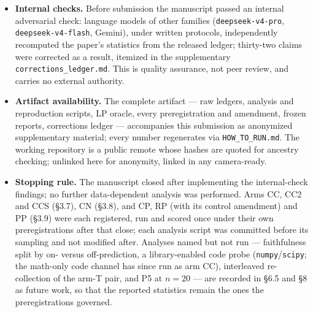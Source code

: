 \begin{itemize}
  specified the instruments and their decision rules, approved each preregistration before
  sampling, made the final inclusion, stopping and submission decisions, and is solely
  responsible for the content. The claim a reader can check is the ordering, not the
  authorship: each preregistration commit is a git ancestor of the sampling it governs.
  Because the drafting models share a family with arms under study (\S5), what a reader is
  asked to trust is the released artifact --- the scripts, raw ledgers, LP oracle and frozen
  outputs, all of which accompany this submission as anonymized supplementary material --- not the author.
\item \textbf{Internal checks.} Before submission the manuscript passed an internal adversarial
  check: language models of other families (\texttt{deepseek-v4-pro}, \texttt{deepseek-v4-flash},
  Gemini), under written protocols, independently recomputed the paper's statistics from the
  released ledger; thirty-two claims were corrected as a result, itemized in the supplementary
  \texttt{corrections\_ledger.md}. This is quality assurance, not peer review, and carries no
  external authority.
\item \textbf{Artifact availability.} The complete artifact --- raw ledgers, analysis and
  reproduction scripts, LP oracle, every preregistration and amendment, frozen reports,
  corrections ledger --- accompanies this submission as anonymized supplementary material;
  every number regenerates via \texttt{HOW\_TO\_RUN.md}. The working repository is a public
  remote whose hashes are quoted for ancestry checking; unlinked here for anonymity, linked
  in any camera-ready.
\item \textbf{Stopping rule.} The manuscript closed after implementing the internal-check
  findings; no further data-dependent analysis was performed. Arms CC, CC2 and CCS (\S3.7), CN (\S3.8),
  and CP, RP (with its control amendment) and PP (\S3.9)
  were each registered, run and scored once under their own preregistrations after that
  close; each analysis script was committed before its sampling and not modified after. Analyses named but
  not run --- faithfulness split by on- versus off-prediction, a library-enabled code probe
  (\texttt{numpy}/\texttt{scipy}; the math-only code channel has since run as arm CC), interleaved
  re-collection of the arm-T pair, and P5 at $n = 20$ --- are recorded in \S6.5 and \S8 as future work,
  so that the reported statistics remain the ones the preregistrations governed.
\end{itemize}
